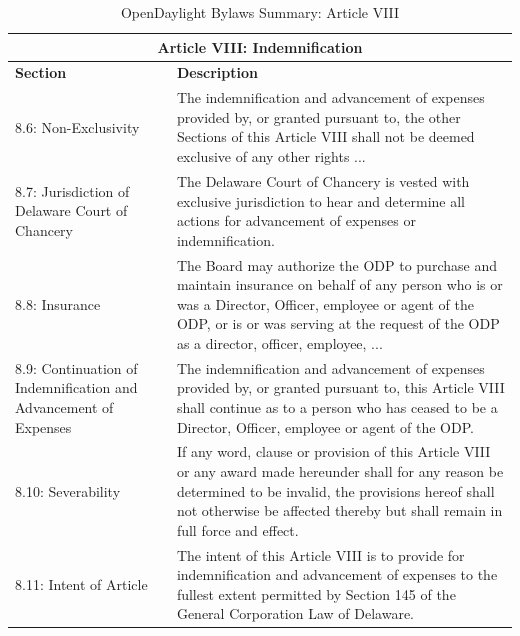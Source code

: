 \documentclass[a4paper, 12pt]{book}
\begin{document}
{\begin{table}[H]
  \begin{center}
    \begin{tabular}{ | p{4cm} | p{11cm} | }
    \toprule
    \multicolumn {2}{|c|}{\textbf{Article VIII: Indemnification}} \\
    \hline
    \textbf{Section} & \textbf{Description} \\
    \hline
    8.6: Non-Exclusivity & The indemnification and advancement of expenses provided by, or granted pursuant to, the other Sections of this Article VIII shall not be deemed exclusive of any other rights ...\\
    \hline
    8.7: Jurisdiction of Delaware Court of Chancery & The Delaware Court of Chancery is vested with exclusive jurisdiction to hear and determine all actions for advancement of expenses or indemnification.\\
    \hline
    8.8: Insurance & The Board may authorize the ODP to purchase and maintain insurance on behalf of any person who is or was a Director, Officer, employee or agent of the ODP, or is or was serving at the request of the ODP as a director, officer, employee, ...\\
    \hline
    8.9: Continuation of Indemnification and Advancement of Expenses & The indemnification and advancement of expenses provided by, or granted pursuant to, this Article VIII shall continue as to a person who has ceased to be a Director, Officer, employee or agent of the ODP.\\
    \hline
    8.10: Severability & If any word, clause or provision of this Article VIII or any award made hereunder shall for any reason be determined to be invalid, the provisions hereof shall not otherwise be affected thereby but shall remain in full force and effect.\\
    \hline
    8.11: Intent of Article & The intent of this Article VIII is to provide for indemnification and advancement of expenses to the fullest extent permitted by Section 145 of the General Corporation Law of Delaware.\\
    \bottomrule
    \end{tabular}
    \caption{OpenDaylight Bylaws Summary: Article VIII}
    \label{tab:odlbylaws-art08}
  \end{center}
\end{table}

}
\end{document}
